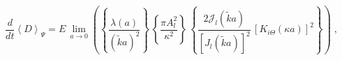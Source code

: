 \begin{equation}
\frac{d}{dt}
\left\langle
D
\right\rangle_{\scriptstyle \!  \Psi}
 = 
E
\,
\lim_{a \rightarrow 0}
\left(
\left\{
\frac{\lambda (a)}{ (\tilde{k} a)^{2} }
\right\}
\,
\left\{
\frac{\pi A_{l}^{2} }{ \kappa^{2} } 
\right\}
\,
\left\{
\frac{ 2 
{\mathcal J_{l}} ( \tilde{k} a )}{ \left[ J_{l}(\tilde{k} a) \right]^{2} }
\,
\left[ K_{i \Theta} (\kappa a) \right]^{2}
\right\}
\right)
\;  ,
\label{eq:anomaly_2D_ISP_circular_well_calculation}
\end{equation}

